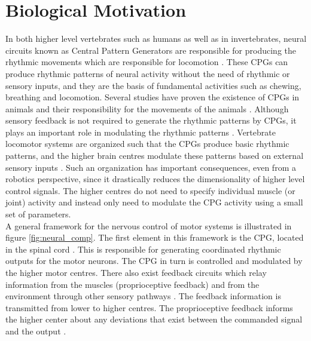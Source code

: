 \documentclass[12pt,twoside]{article}
\theoremstyle{plain}
\theoremstyle{definition}
\theoremstyle{remark}
\newcommand{\forceindent}{\leavevmode{\parindent=2em\indent}}
\begin{document}
\section{Biological Motivation}
\label{sec:Biological_Motivation}
In both higher level vertebrates such as humans as well as in invertebrates, neural circuits known as Central Pattern Generators are responsible for producing the rhythmic movements which are responsible for locomotion \cite{Ijspeert2008}. These CPGs can produce rhythmic patterns of neural activity without the need of rhythmic or sensory inputs, and they are the basis of fundamental activities such as chewing, breathing and locomotion. Several studies have proven the existence of CPGs in animals and their responsibility for the movements of the animals \cite{cohen1980neuronal,grillner1985neural,stein1999neurons}. Although sensory feedback is not required to generate the rhythmic patterns by CPGs, it plays an important role in modulating the rhythmic patterns \cite{Ijspeert2008}. Vertebrate locomotor systems are organized such that the CPGs produce basic rhythmic patterns, and the higher brain centres modulate these patterns based on external sensory inputs \cite{Ijspeert2008}. Such an organization has important consequences, even from a robotics perspective, since it drastically reduces the dimensionality of higher level control signals. The higher centres do not need to specify individual muscle (or joint) activity and instead only need to modulate the CPG activity using a small set of parameters.\\
\forceindent A general framework for the nervous control of motor systems is illustrated in figure \ref{fig:neural_comp}. The first element in this framework is the CPG, located in the spinal cord \cite{neurobiology1994shepherd}. This is responsible for generating coordinated rhythmic outputs for the motor neurons. The CPG in turn is controlled and modulated by the higher motor centres. There also exist feedback circuits which relay information from the muscles (proprioceptive feedback) and from the environment through other sensory pathways \cite{neurobiology1994shepherd}. The feedback information is transmitted from lower to higher centres. The proprioceptive feedback informs the higher center about any deviations that exist between the commanded signal and the output \cite{neurobiology1994shepherd}.
\end{document}
